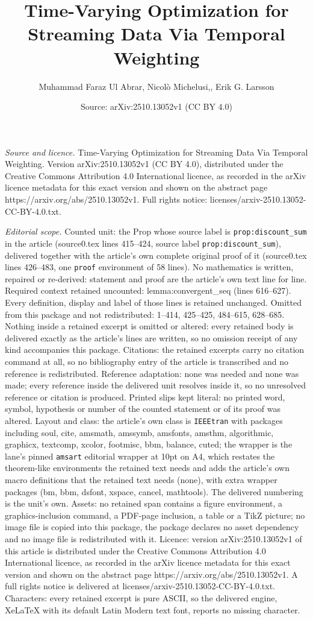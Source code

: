 \documentclass[10pt,a4paper]{amsart}
\title[Time-Varying Optimization for Streaming Data Via Temporal We]{Time-Varying Optimization for Streaming Data Via Temporal Weighting}
\author{Muhammad Faraz Ul Abrar, Nicol\`o Michelusi,, Erik G. Larsson}
\date{Source: arXiv:2510.13052v1 (CC BY 4.0)}
\begin{document}
\maketitle

\noindent\emph{Source and licence.} Time-Varying Optimization for Streaming Data Via Temporal Weighting. Version arXiv:2510.13052v1 (CC BY 4.0), distributed under the Creative Commons Attribution 4.0 International licence, as recorded in the arXiv licence metadata for this exact version and shown on the abstract page https://arxiv.org/abs/2510.13052v1. Full rights notice: licenses/arxiv-2510.13052-CC-BY-4.0.txt.\par\smallskip

\noindent\textit{Editorial scope.} Counted unit: the Prop whose source label is \texttt{prop:discount\_sum} in the article (source0.tex lines 415--424, source label \texttt{prop:discount\_sum}), delivered together with the article's own complete original proof of it (source0.tex lines 426--483, one \texttt{proof} environment of 58 lines). No mathematics is written, repaired or re-derived: statement and proof are the article's own text line for line. Required context retained uncounted: lemma:convergent\_seq (lines 616--627). Every definition, display and label of those lines is retained unchanged. Omitted from this package and not redistributed: 1--414, 425--425, 484--615, 628--685. Nothing inside a retained excerpt is omitted or altered: every retained body is delivered exactly as the article's lines are written, so no omission receipt of any kind accompanies this package. Citations: the retained excerpts carry no citation command at all, so no bibliography entry of the article is transcribed and no reference is redistributed. Reference adaptation: none was needed and none was made; every reference inside the delivered unit resolves inside it, so no unresolved reference or citation is produced. Printed slips kept literal: no printed word, symbol, hypothesis or number of the counted statement or of its proof was altered. Layout and class: the article's own class is \texttt{IEEEtran} with packages including soul, cite, amsmath, amssymb, amsfonts, amsthm, algorithmic, graphicx, textcomp, xcolor, footmisc, bbm, balance, cuted; the wrapper is the lane's pinned \texttt{amsart} editorial wrapper at 10pt on A4, which restates the theorem-like environments the retained text needs and adds the article's own macro definitions that the retained text needs (none), with extra wrapper packages (bm, bbm, dsfont, xspace, cancel, mathtools). The delivered numbering is the unit's own. Assets: no retained span contains a figure environment, a graphics-inclusion command, a PDF-page inclusion, a table or a TikZ picture; no image file is copied into this package, the package declares no asset dependency and no image file is redistributed with it. Licence: version arXiv:2510.13052v1 of this article is distributed under the Creative Commons Attribution 4.0 International licence, as recorded in the arXiv licence metadata for this exact version and shown on the abstract page https://arxiv.org/abs/2510.13052v1. A full rights notice is delivered at licenses/arxiv-2510.13052-CC-BY-4.0.txt. Characters: every retained excerpt is pure ASCII, so the delivered engine, XeLaTeX with its default Latin Modern text font, reports no missing character.
\end{document}
